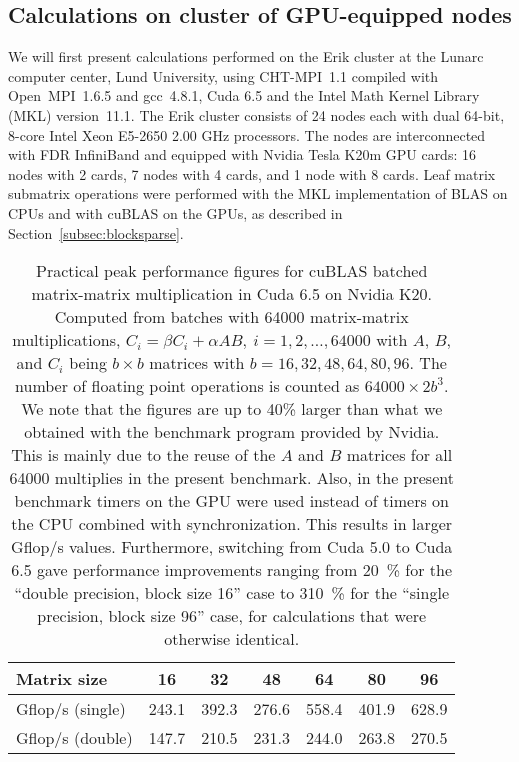 \documentclass{elsarticle}
\begin{document}
\subsection{Calculations on cluster of GPU-equipped nodes}\label{sec:gpu-calculations}
We will first present calculations performed on the Erik cluster at
the Lunarc computer center, Lund University, using CHT-MPI~1.1 compiled with Open~MPI~1.6.5 
and gcc~4.8.1, Cuda 6.5 and the Intel Math Kernel Library (MKL) version~11.1.
The Erik cluster consists of 24 nodes each with dual 64-bit, 8-core
Intel Xeon E5-2650 2.00 GHz processors.  The nodes are interconnected
with FDR InfiniBand and equipped with Nvidia Tesla K20m GPU cards: 16
nodes with 2 cards, 7 nodes with 4 cards, and 1 node with 8 cards.
Leaf matrix submatrix operations were performed with the MKL
implementation of BLAS on CPUs and with cuBLAS on the GPUs, as
described in Section~\ref{subsec:blocksparse}.


\begin{table}
  \begin{center}
    \begin{tabular}{l|cccccc}
      Matrix size      &    16 &    32 &    48 &    64 &    80 &    96 \\
      \hline
      Gflop/s (single) & 243.1 & 392.3 & 276.6 & 558.4 & 401.9 & 628.9 \\
      Gflop/s (double) & 147.7 & 210.5 & 231.3 & 244.0 & 263.8 & 270.5
    \end{tabular}
  \end{center}
  \caption{Practical peak performance figures for cuBLAS batched
    matrix-matrix multiplication in Cuda 6.5 on Nvidia K20. Computed
    from batches with 64000 matrix-matrix multiplications, $C_i =
    \beta C_i + \alpha A B, \ i = 1,2,\dots, 64000$ with $A$, $B$,
    and $C_i$ being $b \times b$ matrices with $b =
    16,32,48,64,80,96$.  The number of floating point operations is
    counted as $64000 \times 2b^3$. We note that the figures are up to
    40\% larger than what we obtained with the benchmark program
    provided by Nvidia. This is mainly due to the reuse of the $A$ and
    $B$ matrices for all 64000 multiplies in the present
    benchmark. Also, in the present benchmark timers on the GPU were
    used instead of timers on the CPU combined with
    synchronization. This results in larger Gflop/s values.
    Furthermore, switching from Cuda 5.0 to Cuda 6.5 gave performance
    improvements ranging from 20~\% for the ``double precision, block
    size 16'' case to 310~\% for the ``single precision, block size
    96'' case, for calculations that were otherwise identical.
    \label{tab:performance_batched_gemm}}
\end{table}
\end{document}

